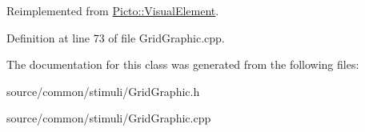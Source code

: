 Reimplemented from \hyperlink{struct_picto_1_1_visual_element_a0e38e859761d1fd7c6285cb2c82f2704}{Picto\-::\-Visual\-Element}.



Definition at line 73 of file Grid\-Graphic.\-cpp.



The documentation for this class was generated from the following files\-:\begin{DoxyCompactItemize}
\item 
source/common/stimuli/Grid\-Graphic.\-h\item 
source/common/stimuli/Grid\-Graphic.\-cpp\end{DoxyCompactItemize}
